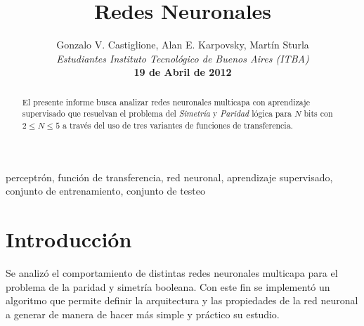 \documentclass[%
    final,
    reprint,
    notitlepage,
    narroweqnarray,
    inline,
    twoside,
    invited
    ]{ieee}
\begin{document}
\title[Redes Neuronales]{%
       Redes Neuronales}

\author[Castiglione, Karpovsky, Sturla]{Gonzalo V. Castiglione, Alan E. Karpovsky, Martín Sturla\\\textit{Estudiantes 
       Instituto Tecnológico de Buenos Aires (ITBA)}\\
\textbf{19 de Abril de 2012}
}


\lognumber{}
\pubitemident{}


\maketitle               

\begin{abstract} 
El presente informe busca analizar  redes neuronales multicapa
con aprendizaje supervisado que resuelvan el problema del \textit{Simetría} y \textit{Paridad} lógica para $N$ bits 
con $2 \le N \le 5$ a través del uso de tres variantes de funciones de transferencia.

\end{abstract}

\begin{keywords}
perceptrón, función de transferencia, red neuronal, aprendizaje supervisado, conjunto de entrenamiento, conjunto de testeo
\end{keywords}

\section{Introducción}

\par Se analizó el comportamiento de distintas redes neuronales multicapa para el problema de la paridad y simetría booleana. 
Con este fin se implementó un algoritmo que permite definir la arquitectura y las propiedades de la red neuronal a generar de 
manera de hacer más simple y práctico su estudio. 
\end{document}
